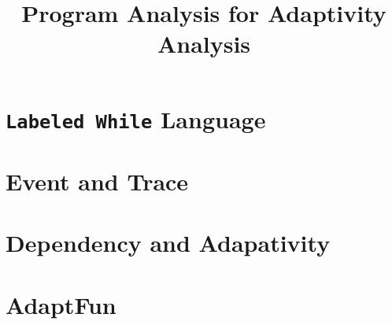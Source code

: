 \documentclass[a4paper,11pt]{article}
\newcommand{\THESYSTEM}{\textsf{AdaptFun}}
\begin{document}
\title{Program Analysis for Adaptivity Analysis}

\author{}

\date{}

\maketitle
%
\tableofcontents

% 
\section{{\tt Labeled While} Language}

\clearpage
\section{Event and Trace}


\clearpage
\section{Dependency and Adapativity}


% 
\clearpage
\section{\THESYSTEM}
\label{sec:adpfun}





\clearpage
%
\end{document}

